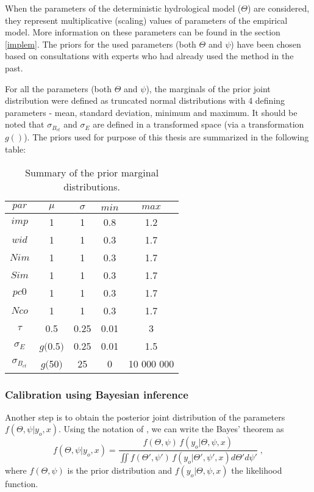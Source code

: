 \documentclass{ctuthesis}\usepackage[]{graphicx}\usepackage[]{color}
\begin{document}
When the parameters of the deterministic hydrological model ($\Theta$) are considered, they represent multiplicative (scaling) values of  parameters of the empirical model. More information on these parameters can be found in the section \ref{implem}.  The priors for the used parameters (both $\Theta$ and  $\psi$) have been chosen based on consultations with experts who had already used the method in the past. 

For all the parameters (both $\Theta$ and $\psi$), the marginals of the prior joint distribution were defined as truncated normal distributions with 4 defining parameters - mean, standard deviation, minimum and maximum. It should be noted that  $\sigma_{B_{ct}}$ and  $\sigma_E$ are defined in a transformed space (via a transformation $g()$). The priors used for purpose of this thesis are summarized in the following table:

\begin{table}[H]
\centering
\begin{tabular}{ c | c | c | c | c }
	$par$		&	$\mu$ & 	$\sigma$	& 	$min$ 			& 	 $max$  \\ \hline \hline

	$imp$		&	1	&	1		&	0.8			&	1.2		\\ \hline
	$wid$		&	1	&	1		&	0.3			&	1.7		\\ \hline
	$Nim$		&	1	&	1		&	0.3			&	1.7		\\ \hline
	$Sim$		&	1	&	1		&	0.3			&	1.7		\\ \hline
	$pc0$		&	1	&	1		&	0.3			&	1.7		\\ \hline
	$Nco$		&	1	&	1		&	0.3			&	1.7		\\ \hline
	
	$\tau$		&	0.5		&	0.25		&	0.01			&	3	\\ \hline
	$\sigma_E$		&	$g($0.5$)$	&	0.25		&	0.01			&	1.5	\\ \hline
	$\sigma_{B_{ct}}$	&	$g($50$)$	&	25		&	0			&	10 000 000
	
	
\end{tabular}
\caption{Summary of the prior marginal distributions.}
\label{kalibracia_tab}
\end{table}



\subsubsection{Calibration using Bayesian inference} \label{calib}
Another step is to obtain the posterior joint distribution of the parameters $ f (\Theta, \psi | y_o, x) $. Using the notation of \cite{giudice2013improving}, we can write the Bayes' theorem as
\begin{equation}
 f (\Theta, \psi | y_o, x) = \frac{ f(\Theta, \psi) \, f(y_o | \Theta, \psi, x) } { \iint f(\Theta' , \psi') \, f(y_o | \Theta', \psi', x) d\Theta' d\psi'} \; ,
\end{equation}
where $f(\Theta, \psi)$ is the prior distribution  and $ f(y_o | \Theta, \psi, x)$ the likelihood function.
\end{document}
